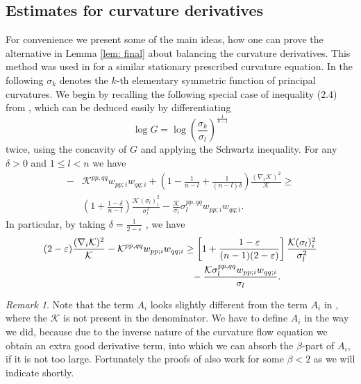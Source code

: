 \documentclass{amsart}
\theoremstyle{definition}
\theoremstyle{remark}
\newtheorem{remark}[theorem]{Remark}
\numberwithin{equation}{section}
\begin{document}
\subsection*{Estimates for curvature derivatives}
For convenience we present some of the main ideas, how one can prove the alternative in Lemma \ref{lem: final} about balancing the curvature derivatives. This method was used in \cite{Guan} for a similar stationary prescribed curvature equation.
In the following $\sigma_k$ denotes the $k$-th elementary symmetric function of principal curvatures. We begin by recalling the following special case of inequality (2.4) from \cite[Lemma 2.2]{Guan}, which can be deduced easily by differentiating 
\[\log G=\log \left(\frac{\sigma_k}{\sigma_l}\right)^{\frac{1}{k-l}}\] twice, using the concavity of $G$ and applying the Schwartz inequality.
For any $\delta>0$ and $1\leq l<n$ we have
\begin{align*}
-&\mathcal{K}^{pp,qq}w_{pp;i}w_{qq;i}+\left(1-\frac{1}{n-l}+\frac{1}{(n-l)\delta}\right)\frac{(\nabla_i\mathcal{K})^2}{\mathcal{K}}\geq \\
&\left(1+\frac{1-\delta}{n-l}\right)\frac{\mathcal{K}(\sigma_l)_i^2}{\sigma_l^2}-\frac{\mathcal{K}}{\sigma_l}\sigma_l^{pp,qq}w_{pp;i}w_{qq;i}.
\end{align*}
In particular, by taking $\delta=\frac{1}{2-\varepsilon}$ , we have
\begin{align}\begin{split}\label{key ineq}
(2-\varepsilon)\frac{(\nabla_i\mathcal{K})^2}{\mathcal{K}}-\mathcal{K}^{pp,qq}w_{pp;i}w_{qq;i}&\geq \left[1+\frac{1-\varepsilon}{(n-1)(2-\varepsilon)}\right]\frac{\mathcal{K}(\sigma_l)_i^2}{\sigma_l^2}\\
					&\hphantom{=}-\frac{\mathcal{K}\sigma_l^{pp,qq}w_{pp;i}w_{qq;i}}{\sigma_l}.
\end{split}\end{align}



\begin{remark}
Note that the term $A_i$ looks slightly different from the term $A_i$ in \cite{Guan}, where the $\mathcal{K}$ is not present in the denominator. We have to define $A_i$ in the way we did, because due to the inverse nature of the curvature flow equation we obtain an extra good derivative term, into which we can absorb the $\beta$-part of $A_i$, if it is not too large. Fortunately the proofs of \cite[Lemma~4.2, Lemma~4.3]{Guan} also work for some $\beta<2$ as we will indicate shortly.
\end{remark}
\end{document}
